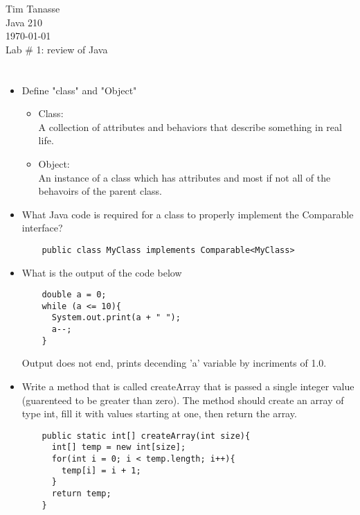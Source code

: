\documentclass{article}
\begin{document}
\begin{flushright}
  Tim Tanasse\\
  Java 210\\
  \today \\
  Lab \# 1: review of Java \\
\end{flushright}
\section*{}
\begin{itemize}
  \item Define "class" and "Object"
  \begin{itemize}
    \item Class:\\
    A collection of attributes and behaviors that describe something in real life.
    \item Object:\\
    An instance of a class which has attributes and most if not all of the behavoirs of the parent class.
  \end{itemize}
  \item What Java code is required for a class to properly implement the Comparable interface?
  \begin{lstlisting}
    public class MyClass implements Comparable<MyClass>
  \end{lstlisting}
  \item What is the output of the code below
  \begin{lstlisting}
    double a = 0;
    while (a <= 10){
      System.out.print(a + " ");
      a--;
    }
  \end{lstlisting}
  Output does not end, prints decending 'a' variable by incriments of 1.0.
  \item Write a method that is called createArray that is passed a single integer value (guarenteed to be greater than zero). The method should create an array of type int, fill it with values starting at one, then return the array.
  \begin{lstlisting}
    public static int[] createArray(int size){
      int[] temp = new int[size];
      for(int i = 0; i < temp.length; i++){
        temp[i] = i + 1;
      }
      return temp;
    }
  \end{lstlisting}
  \end{itemize}
\pagebreak
\end{document}
